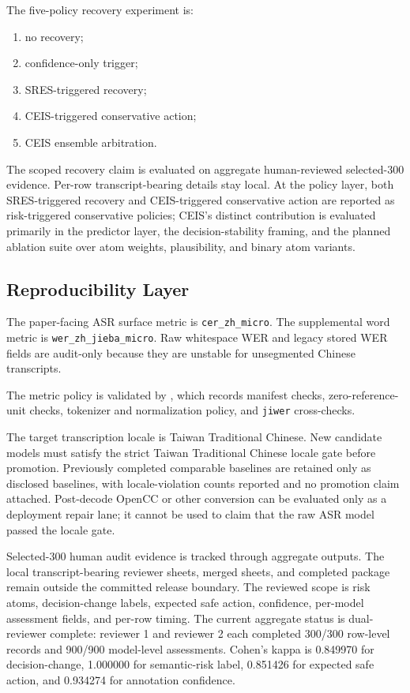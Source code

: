 \documentclass[
]{article}
\newcommand{\codepath}[1]{\begingroup\ttfamily\scriptsize\seqsplit{#1}\endgroup}
\providecommand{\tightlist}{%
  \setlength{\itemsep}{0pt}\setlength{\parskip}{0pt}}
\begin{document}
The five-policy recovery experiment is:

\begin{enumerate}
\def\labelenumi{\arabic{enumi}.}
\tightlist
\item
  no recovery;
\item
  confidence-only trigger;
\item
  SRES-triggered recovery;
\item
  CEIS-triggered conservative action;
\item
  CEIS ensemble arbitration.
\end{enumerate}

The scoped recovery claim is evaluated on aggregate human-reviewed
selected-300 evidence. Per-row transcript-bearing details stay local.
At the policy layer, both SRES-triggered recovery and CEIS-triggered
conservative action are reported as risk-triggered conservative
policies; CEIS's distinct contribution is evaluated primarily in the
predictor layer, the decision-stability framing, and the planned
ablation suite over atom weights, plausibility, and binary atom
variants.

\hypertarget{reproducibility-layer}{%
\subsection{Reproducibility Layer}\label{reproducibility-layer}}

The paper-facing ASR surface metric is \texttt{cer\_zh\_micro}. The
supplemental word metric is \texttt{wer\_zh\_jieba\_micro}. Raw
whitespace WER and legacy stored WER fields are audit-only because they
are unstable for unsegmented Chinese transcripts.

The metric policy is validated by
\codepath{70\_experiments/runs/wer\_metric\_audit\_2026\_05\_25/}, which
records manifest checks, zero-reference-unit checks, tokenizer and
normalization policy, and \texttt{jiwer} cross-checks.

The target transcription locale is Taiwan Traditional Chinese. New
candidate models must satisfy the strict Taiwan Traditional Chinese
locale gate before promotion. Previously completed comparable baselines
are retained only as disclosed baselines, with locale-violation counts
reported and no promotion claim attached. Post-decode OpenCC or other
conversion can be evaluated only as a deployment repair lane; it cannot
be used to claim that the raw ASR model passed the locale gate.

Selected-300 human audit evidence is tracked through aggregate outputs.
The local transcript-bearing reviewer sheets, merged sheets, and
completed package remain outside the committed release boundary. The
reviewed scope is risk atoms, decision-change labels, expected safe
action, confidence, per-model assessment fields, and per-row timing. The
current aggregate status is dual-reviewer complete: reviewer 1 and
reviewer 2 each completed 300/300 row-level records and 900/900
model-level assessments. Cohen's kappa is 0.849970 for
decision-change, 1.000000 for semantic-risk label, 0.851426 for
expected safe action, and 0.934274 for annotation confidence.
\end{document}
